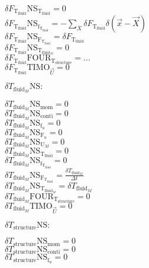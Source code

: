 \documentclass[10pt]{article} %
\begin{document}
\begin{center}
	$\delta F_{\text{T}_{\text{fluid}}} \text{NS}_{\text{T}_{\text{fluid}}} = 0 $\\
	$\delta F_{\text{T}_{\text{fluid}}} \text{NS}_{\text{f}_{\text{T}_{\text{fluid}}}} = -\sum_X \delta F_{\text{T}_{\text{fluid}}} \delta (\vec{x}-\vec{X})$\\
	$\delta F_{\text{T}_{\text{fluid}}} \text{NS}_{\text{F}_{\text{T}_{\text{fluid}}}} = \delta F_{\text{T}_{\text{fluid}}}$\\
	$\delta F_{\text{T}_{\text{fluid}}} \text{NS}_{\text{T}_{\text{fluid}_M}} = 0$\\
	$\delta F_{\text{T}_{\text{fluid}}} \text{FOUR}_{\text{T}_{\text{structure}}} = ...$\\
	$\delta F_{\text{T}_{\text{fluid}}} \text{TIMO}_{\vec{U}} = 0$\\
\begin{flushleft}
	$\delta T_{\text{fluid}_M} \text{NS}:$
\end{flushleft}
	$\delta T_{\text{fluid}_M} \text{NS}_{\text{mom}} =  0$\\
	$\delta T_{\text{fluid}_M} \text{NS}_{\text{conti}} = 0$\\
	$\delta T_{\text{fluid}_M} \text{NS}_{\text{f}_u} = 0$\\
	$\delta T_{\text{fluid}_M} \text{NS}_{\text{F}_u} = 0$\\
	$\delta T_{\text{fluid}_M} \text{NS}_{\text{U}_M} = 0$\\
	$\delta T_{\text{fluid}_M} \text{NS}_{\text{T}_{\text{fluid}}} = 0$\\
	$\delta T_{\text{fluid}_M} \text{NS}_{\text{f}_{\text{T}_{\text{fluid}}}} = 0$\\
	$\delta T_{\text{fluid}_M} \text{NS}_{\text{F}_{\text{T}_{\text{fluid}}}} = \frac{\delta T_{\text{fluid}_M}}{\Delta t}$\\
	$\delta T_{\text{fluid}_M} \text{NS}_{\text{T}_{\text{fluid}_M}} = \delta T_{\text{fluid}_M}$\\
	$\delta T_{\text{fluid}_M} \text{FOUR}_{\text{T}_{\text{structure}}} = 0$\\
	$\delta T_{\text{fluid}_M} \text{TIMO}_{\vec{U}} = 0$\\
\begin{flushleft}
	$\delta T_{\text{structure}} \text{NS}:$
\end{flushleft}
	$\delta T_{\text{structure}} \text{NS}_{\text{mom}} = 0$\\
	$\delta T_{\text{structure}} \text{NS}_{\text{conti}} = 0$\\
	$\delta T_{\text{structure}} \text{NS}_{\text{f}_u} = 0$\\

\end{center}
\end{document}
